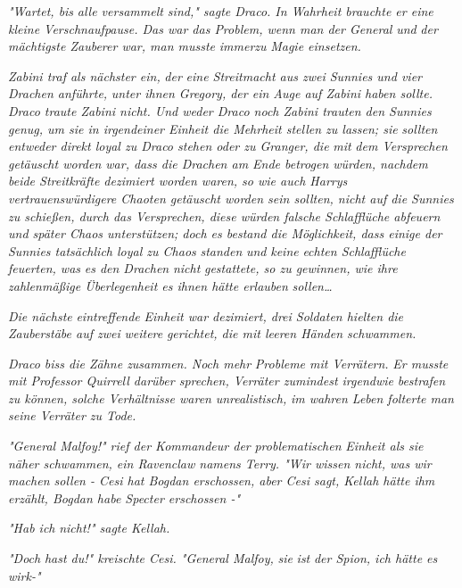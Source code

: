 {\emph{"Wartet, bis} \emph{alle versammelt sind," sagte Draco. In Wahrheit brauchte er eine kleine Verschnaufpause. Das war das Problem, wenn man der General} \emph{\emph{und}} \emph{der mächtigste Zauberer war, man musste} \emph{immerzu} \emph{Magie einsetzen.}

\emph{Zabini traf als nächster ein,} \emph{der} \emph{eine Streitmacht aus zwei Sunnies und vier Drachen anführte,} \emph{unter ihnen Gregory, der ein Auge auf Zabini haben sollte. Draco traute Zabini nicht. Und weder Draco noch Zabini trauten den Sunnies genug, um sie in irgendeiner Einheit die Mehrheit stellen zu lassen; sie} \emph{\emph{sollten}} \emph{entweder direkt loyal zu Draco stehen oder zu Granger, die} \emph{mit} \emph{dem Versprechen getäuscht worden war, dass die Drachen am Ende betrogen würden, nachdem beide Streitkräfte dezimiert worden waren, so wie auch Harrys vertrauenswürdigere Chaoten getäuscht worden sein sollten, nicht auf die Sunnies zu schießen, durch das Versprechen, diese würden falsche Schlafflüche abfeuern und später Chaos unterstützen; doch es bestand die Möglichkeit, dass einige der Sunnies tatsächlich loyal zu Chaos} \emph{\emph{standen}} \emph{und} \emph{\emph{keine}} \emph{echten Schlafflüche feuerten, was} \emph{es den Drachen} \emph{nicht} \emph{gestattete, so zu gewinnen, wie ihre zahlenmäßige Überlegenheit es ihnen hätte erlauben} \emph{sollen…}

\emph{Die nächste} \emph{eintreffende} \emph{Einheit war dezimiert, drei Soldaten hielten die Zauberstäbe auf zwei} \emph{weitere} \emph{gerichtet, die mit leeren Händen schwammen.}

\emph{Draco biss die Zähne zusammen. Noch mehr} \emph{Probleme mit Verrätern.} \emph{Er musste mit Professor Quirrell darüber sprechen, Verräter zumindest irgendwie} \emph{\emph{bestrafen}} \emph{zu können, solche Verhältnisse waren} \emph{\emph{unrealistisch,}} \emph{im wahren Leben folterte man seine Verräter zu Tode.}

\emph{"General Malfoy!" rief der Kommandeur der} \emph{problematischen} \emph{Einheit als sie näher schwammen, ein Ravenclaw namens Terry. "Wir wissen nicht, was wir machen sollen - Cesi hat Bogdan erschossen, aber Cesi sagt, Kellah hätte ihm erzählt, Bogdan habe Specter erschossen -"}

\emph{"Hab ich} \emph{\emph{nicht!}" sagte Kellah.}

\emph{"Doch} \emph{\emph{hast du!}" kreischte Cesi. "General Malfoy,} \emph{\emph{sie}} \emph{ist} \emph{der Spion, ich hätte es wirk-"}

}

